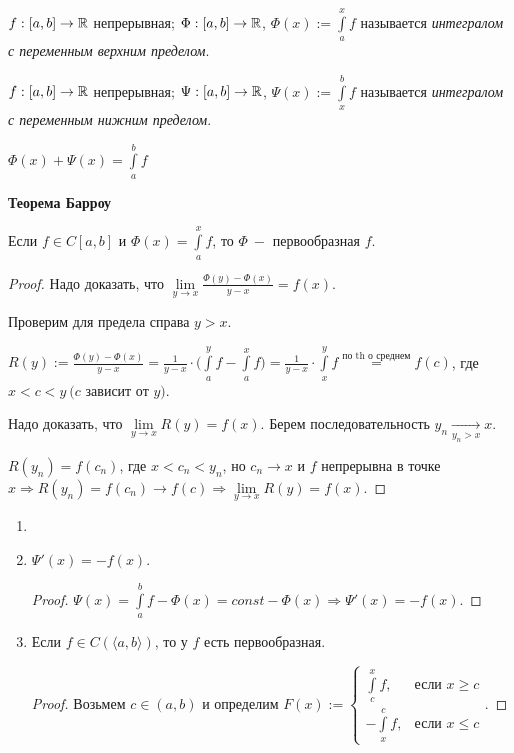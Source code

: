 \setcounter{section}{4}
\begin{definition}
    $f:[a, b]\rightarrow \mathbb{R}$ непрерывная; $\Phi:[a, b]\rightarrow \mathbb{R}$, $\Phi(x):=\int\limits_a^x f$ называется \textit{интегралом с переменным верхним пределом}.
\end{definition}

\begin{definition}
    $f:[a, b]\rightarrow \mathbb{R}$ непрерывная; $\Psi:[a, b]\rightarrow \mathbb{R}$, $\Psi(x):=\int\limits_x^b f$ называется \textit{интегралом с переменным нижним пределом}.
\end{definition}

\begin{remark}
    $\Phi(x)+\Psi(x)=\int\limits_a^b f$
\end{remark}

\begin{theorem}
    \textbf{Теорема Барроу}

    Если $f\in C[a, b]$ и $\Phi(x)=\int\limits_a^x f$, то $\Phi\ -$ первообразная $f$.
\end{theorem}

\begin{proof}
    Надо доказать, что $\lim \limits_{y\rightarrow x}\frac{\Phi(y)-\Phi(x)}{y-x}=f(x)$.

    Проверим для предела справа $y>x$. 
    
    $R(y):=\frac{\Phi(y)-\Phi(x)}{y-x}=\frac{1}{y-x}\cdot \bigg(\int\limits_a^y f - \int\limits_a^x f \bigg)=\frac{1}{y-x}\cdot \int\limits_x^y f\overset{\text{по th о среднем}}{=} f(c)$, где $x<c<y\ (c$ зависит от $y)$.

    Надо доказать, что $\lim\limits_{y\rightarrow x} R(y)=f(x)$. Берем последовательность $y_n\underset{y_n>x}{\rightarrow} x$.

    $R(y_n)=f(c_n)$, где $x<c_n<y_n$, но $ c_n\rightarrow x$ и $f$ непрерывна в точке $x\Rightarrow R(y_n)=f(c_n)\rightarrow f(c)\Rightarrow \lim\limits_{y\rightarrow x} R(y)=f(x)$.
\end{proof}

\begin{corollary}
    \begin{enumerate}
        \item[]
        \item $\Psi'(x)=-f(x)$.
        \begin{proof}
            $\Psi(x)=\int\limits_a^b f-\Phi(x)=const -\Phi(x)\Rightarrow \Psi'(x)=-f(x)$.
        \end{proof}
        \item Если $f\in C(\langle a, b \rangle)$, то у $f$ есть первообразная.
        \begin{proof}
            Возьмем $c\in (a, b)$ и определим $F(x):=\begin{cases} \int\limits_c^x f, &\text{если $x\geq c$} \\
            -\int\limits_x^c f, &\text{если $x\leq c$}
            \end{cases}$.
        \end{proof}
    \end{enumerate}
\end{corollary}

